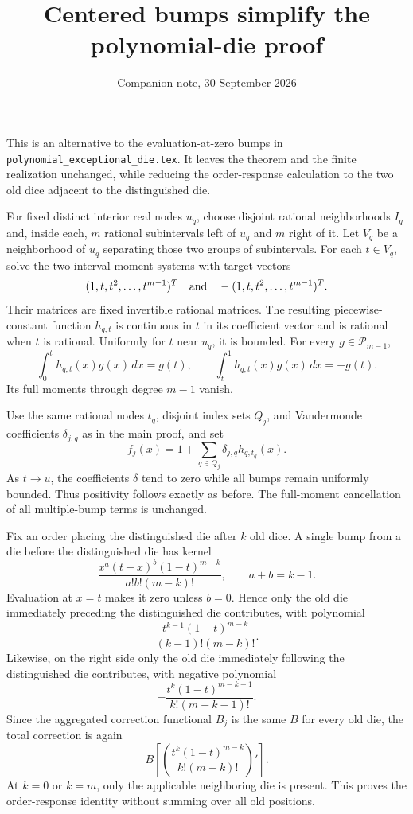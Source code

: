 \documentclass[11pt]{article}
\title{Centered bumps simplify the polynomial-die proof}
\author{Companion note, 30 September 2026}
\date{}
\begin{document}
\maketitle
This is an alternative to the evaluation-at-zero bumps in
\texttt{polynomial\_exceptional\_die.tex}. It leaves the theorem and the
finite realization unchanged, while reducing the order-response calculation
to the two old dice adjacent to the distinguished die.

For fixed distinct interior real nodes $u_q$, choose disjoint rational
neighborhoods $I_q$ and, inside each, $m$ rational subintervals left of
$u_q$ and $m$ right of it. Let $V_q$ be a neighborhood of $u_q$ separating
those two groups of subintervals. For each $t\in V_q$, solve the two
interval-moment systems with target vectors
\[
 (1,t,t^2,\ldots,t^{m-1})^T
 \quad\hbox{and}\quad
 -(1,t,t^2,\ldots,t^{m-1})^T.
\]
Their matrices are fixed invertible rational matrices. The resulting
piecewise-constant function $h_{q,t}$ is continuous in $t$ in its
coefficient vector and is rational when $t$ is rational. Uniformly for
$t$ near $u_q$, it is bounded. For every $g\in\mathcal P_{m-1}$,
\[
 \int_0^t h_{q,t}(x)g(x)\,dx=g(t),\qquad
 \int_t^1 h_{q,t}(x)g(x)\,dx=-g(t).
\]
Its full moments through degree $m-1$ vanish.

Use the same rational nodes $t_q$, disjoint index sets $Q_j$, and
Vandermonde coefficients $\delta_{j,q}$ as in the main proof, and set
\[
 f_j(x)=1+\sum_{q\in Q_j}\delta_{j,q}h_{q,t_q}(x).
\]
As $t\to u$, the coefficients $\delta$ tend to zero while all bumps
remain uniformly bounded. Thus positivity follows exactly as before.
The full-moment cancellation of all multiple-bump terms is unchanged.

Fix an order placing the distinguished die after $k$ old dice. A single
bump from a die before the distinguished die has kernel
\[
 \frac{x^a(t-x)^b(1-t)^{m-k}}{a!b!(m-k)!},\qquad a+b=k-1.
\]
Evaluation at $x=t$ makes it zero unless $b=0$. Hence only the old die
immediately preceding the distinguished die contributes, with polynomial
\[
 \frac{t^{k-1}(1-t)^{m-k}}{(k-1)!(m-k)!}.
\]
Likewise, on the right side only the old die immediately following the
distinguished die contributes, with negative polynomial
\[
 -\frac{t^k(1-t)^{m-k-1}}{k!(m-k-1)!}.
\]
Since the aggregated correction functional $B_j$ is the same $B$ for
every old die, the total correction is again
\[
 B\left[\left(\frac{t^k(1-t)^{m-k}}{k!(m-k)!}\right)'\right].
\]
At $k=0$ or $k=m$, only the applicable neighboring die is present.
This proves the order-response identity without summing over all old
positions.
\end{document}
